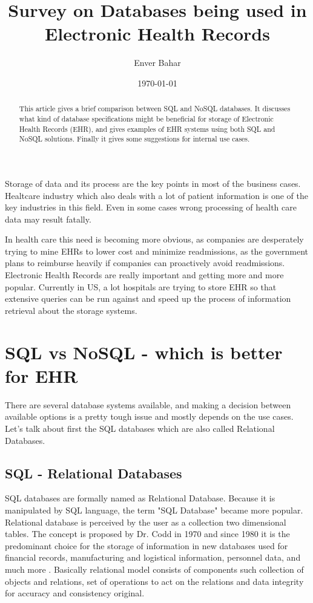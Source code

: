 \documentclass{article}
\begin{document}
\title{Survey on Databases being used in Electronic Health Records}   %
\author{Enver Bahar}         %
\date{\today}    %
\maketitle

\begin{abstract}
This article gives a brief comparison between SQL and NoSQL databases. It discusses what kind of database specifications might be beneficial for storage of Electronic Health Records (EHR), and gives examples of EHR systems using both SQL and NoSQL solutions. Finally it gives some suggestions for internal use cases. \\
\end{abstract} 

Storage of data and its process are the key points in most of the business cases.  Healtcare industry which also deals with a lot of patient information is one of the key industries in this field. 
Even in some cases wrong processing of health care data  may result fatally.
 
In health care this need is becoming more obvious, as companies are desperately trying to mine EHRs to lower cost and minimize readmissions, as the government plans to reimburse heavily if companies can proactively avoid readmissions. Electronic Health Records are really important and getting more and more popular. Currently in US, a lot hospitals are trying to store EHR so that extensive queries can be run against and speed up the process of information retrieval about the storage systems. 

\section{SQL vs NoSQL - which is better for EHR}

There are several database systems available, and making a decision between available options is a pretty tough issue and mostly depends on the use cases. Let's talk about first the SQL databases which are also called Relational Databases. 

\subsection{SQL - Relational Databases}
SQL databases are formally named as Relational Database. Because it is manipulated by SQL language, the term "SQL Database" became more popular. Relational database is perceived by the user as a collection two dimensional tables. The concept is proposed by Dr. Codd in 1970 and since 1980 it is the predominant choice for the storage of information in new databases used for financial records, manufacturing and logistical information, personnel data, and much more \cite{online1}. Basically relational model consists of components such collection of objects and relations, set of operations to act on the relations and data integrity for accuracy and consistency original.
\end{document}
